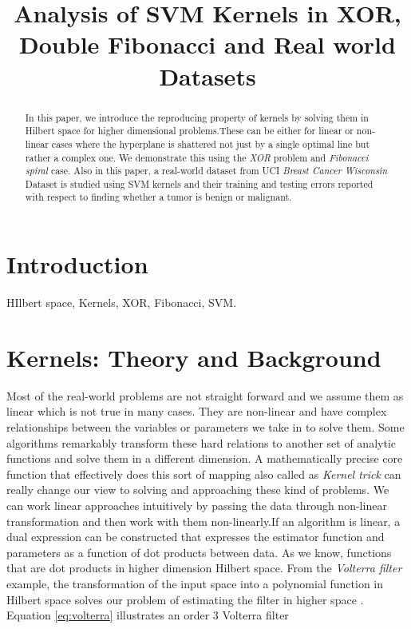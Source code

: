 \documentclass[conference]{IEEEtran}
\title{Analysis of SVM Kernels in XOR, Double Fibonacci and Real world Datasets}
\author{\IEEEauthorblockN{Gangadharan Esakki}
\IEEEauthorblockA{\{gesakki\}{\tt @unm.edu}\\
               Department of Electrical and Computer Engineering \\
              The University of New Mexico, United States}}
\begin{document}
\maketitle

\section{Introduction} 
\begin{abstract}

In this paper, we introduce the reproducing property of kernels by solving them in Hilbert space for higher dimensional problems.These can be either for linear or non-linear cases where the hyperplane is shattered not just by a single optimal line but rather a complex one. We demonstrate this using the \textit {XOR} problem and \textit {Fibonacci spiral} case. Also in this paper, a real-world dataset from UCI \textit {Breast Cancer Wisconsin} Dataset is studied using SVM kernels and their training and testing errors reported with respect to finding whether a tumor is benign or malignant. 

\end{abstract}

\begin{IEEEkeywords}
HIlbert space, Kernels, XOR, Fibonacci, SVM.
\end{IEEEkeywords}


\section{Kernels: Theory and Background}
Most of the real-world problems are not straight forward and we assume them as linear which is not true in many cases. They are non-linear and have complex relationships between the variables or parameters we take in to solve them. Some algorithms remarkably transform these hard relations to another set of analytic functions and solve them in a different dimension. A mathematically precise core function that effectively does this sort of mapping also called as \textit{Kernel trick} can really change our view to solving and approaching these kind of problems. We can work linear approaches intuitively by passing the data  through non-linear transformation and then work with them non-linearly.If an algorithm is linear, a dual expression can be constructed that expresses the estimator function and parameters as a function of dot products between data. As we know, functions that are dot products in higher dimension Hilbert space. From the \textit{Volterra filter} example,
the transformation of the input space into a polynomial function in Hilbert space solves our problem of estimating the filter in higher space . Equation \ref{eq:volterra} illustrates an order 3 Volterra filter \cite{kernme}
\end{document}
